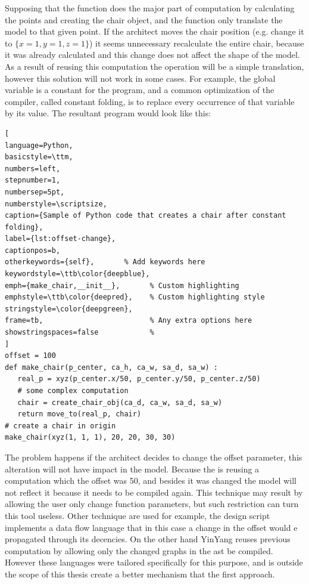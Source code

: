 Supposing that the function  does the major part of computation by calculating the points and creating the chair object, and the  function only translate the model to that given point. If the architect moves the chair position (e.g. change it to $\{ x\!=\!1,y\!=\!1,z\!=\!1 \}$) it seems unnecessary recalculate the entire chair, because it was already calculated and this change does not affect the shape of the model. As a result of reusing this computation the operation will be a simple translation, however this solution will not work in some cases. For example, the global variable  is a constant for the program, and a common optimization of the compiler, called constant folding, is to replace every occurrence of that variable by its value. The resultant program would look like this: \\

\begin{lstlisting}[
language=Python,
basicstyle=\ttm,
numbers=left,
stepnumber=1,
numbersep=5pt,                   
numberstyle=\scriptsize, 
caption={Sample of Python code that creates a chair after constant folding},
label={lst:offset-change},
captionpos=b, 
otherkeywords={self},       % Add keywords here
keywordstyle=\ttb\color{deepblue},
emph={make_chair,__init__},       % Custom highlighting
emphstyle=\ttb\color{deepred},    % Custom highlighting style
stringstyle=\color{deepgreen},
frame=tb,                         % Any extra options here
showstringspaces=false            % 
]
offset = 100
def make_chair(p_center, ca_h, ca_w, sa_d, sa_w) :
   real_p = xyz(p_center.x/50, p_center.y/50, p_center.z/50)
   # some complex computation
   chair = create_chair_obj(ca_d, ca_w, sa_d, sa_w)
   return move_to(real_p, chair)
# create a chair in origin
make_chair(xyz(1, 1, 1), 20, 20, 30, 30)
\end{lstlisting}

The problem happens if the architect decides to change the offset parameter, this alteration will not have impact in the model. Because the  is reusing a computation which the offset was 50, and besides it was changed the model will not reflect it because it needs to be compiled again. This technique may result by allowing the user only change function parameters, but such restriction can turn this tool useless. Other technique are used for example, the design script implements a data flow language that in this case a change in the offset would e propagated through its decencies. On the other hand YinYang reuses previous computation by allowing only the changed graphs in the \gls{ast} be compiled. However these languages were tailored specifically for this purpose, and is outside the scope of this thesis create a better mechanism that the first approach.

